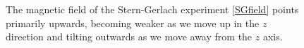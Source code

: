 \documentclass[12pt,secnumarabic,amsmath,amssymb,balancelastpage,nofootinbib]{article}
\begin{document}
\begin{figure}[p!]
\caption{The magnetic field of the Stern-Gerlach experiment \eqref{SGfield} points primarily upwards, becoming weaker as we move up in the $z$ direction and tilting outwards as we move away from the $z$ axis.}
  \label{SGfieldfig}
\end{figure}
\end{document}
